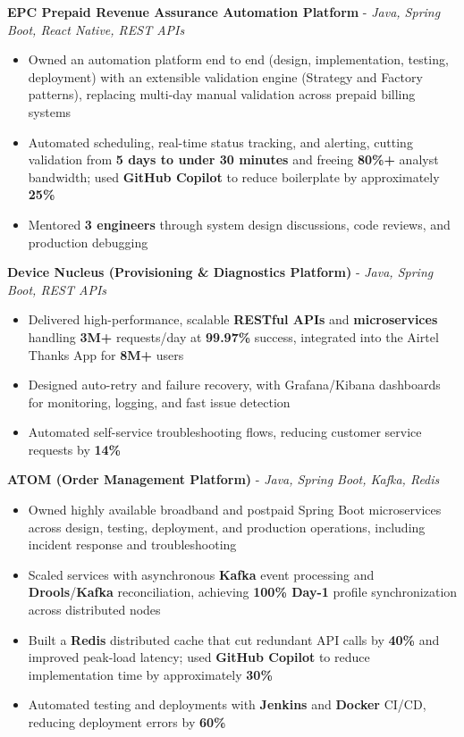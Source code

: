 \documentclass[letterpaper,10pt]{article}
\newcommand{\resumeItem}[1]{
  \item\small{{#1 \vspace{-2pt}}}
}
\newcommand{\resumeItemListStart}{\begin{itemize}[itemsep=0pt,topsep=2pt,parsep=0pt]}
\newcommand{\resumeItemListEnd}{\end{itemize}\vspace{-5pt}}
\begin{document}
      \vspace{4pt}
      \textbf{\small EPC Prepaid Revenue Assurance Automation Platform} - \textit{\small Java, Spring Boot, React Native, REST APIs} \\
      \vspace{-2pt}
      \resumeItemListStart
        \resumeItem{Owned an automation platform end to end (design, implementation, testing, deployment) with an extensible validation engine (Strategy and Factory patterns), replacing multi-day manual validation across prepaid billing systems}
        \resumeItem{Automated scheduling, real-time status tracking, and alerting, cutting validation from \textbf{5 days to under 30 minutes} and freeing \textbf{80\%+} analyst bandwidth; used \textbf{GitHub Copilot} to reduce boilerplate by approximately \textbf{25\%}}
        \resumeItem{Mentored \textbf{3 engineers} through system design discussions, code reviews, and production debugging}
      \resumeItemListEnd

      \vspace{2pt}
      \textbf{\small Device Nucleus (Provisioning \& Diagnostics Platform)} - \textit{\small Java, Spring Boot, REST APIs} \\
      \vspace{-2pt}
      \resumeItemListStart
        \resumeItem{Delivered high-performance, scalable \textbf{RESTful APIs} and \textbf{microservices} handling \textbf{3M+} requests/day at \textbf{99.97\%} success, integrated into the Airtel Thanks App for \textbf{8M+} users}
        \resumeItem{Designed auto-retry and failure recovery, with Grafana/Kibana dashboards for monitoring, logging, and fast issue detection}
        \resumeItem{Automated self-service troubleshooting flows, reducing customer service requests by \textbf{14\%}}
      \resumeItemListEnd

      \vspace{2pt}
      \textbf{\small ATOM (Order Management Platform)} - \textit{\small Java, Spring Boot, Kafka, Redis} \\
      \vspace{-2pt}
      \resumeItemListStart
        \resumeItem{Owned highly available broadband and postpaid Spring Boot microservices across design, testing, deployment, and production operations, including incident response and troubleshooting}
        \resumeItem{Scaled services with asynchronous \textbf{Kafka} event processing and \textbf{Drools}/\textbf{Kafka} reconciliation, achieving \textbf{100\% Day-1} profile synchronization across distributed nodes}
        \resumeItem{Built a \textbf{Redis} distributed cache that cut redundant API calls by \textbf{40\%} and improved peak-load latency; used \textbf{GitHub Copilot} to reduce implementation time by approximately \textbf{30\%}}
        \resumeItem{Automated testing and deployments with \textbf{Jenkins} and \textbf{Docker} CI/CD, reducing deployment errors by \textbf{60\%}}
      \resumeItemListEnd
\end{document}
